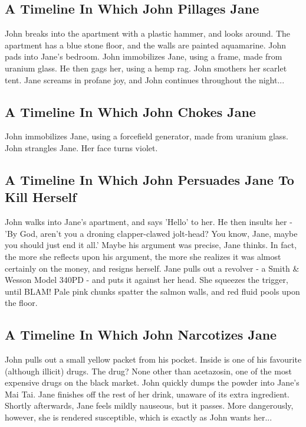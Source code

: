 \documentclass{article}
\begin{document}
\subsection{A Timeline In Which John Pillages Jane}


John breaks into the apartment with a plastic hammer, and looks around.
The apartment has a blue stone floor, and the walls are painted aquamarine.
John pads into Jane's bedroom.
John immobilizes Jane, using a frame, made from uranium glass.
He then gags her, using a hemp rag.
John smothers her scarlet tent.
Jane screams in profane joy, and John continues throughout the night...
\subsection{A Timeline In Which John Chokes Jane}


John immobilizes Jane, using a forcefield generator, made from uranium glass.
John strangles Jane.
Her face turns violet.
\subsection{A Timeline In Which John Persuades Jane To Kill Herself}


John walks into Jane's apartment, and says 'Hello' to her.
He then insults her {-} 'By God, aren't you a droning clapper{-}clawed jolt{-}head?
You know, Jane, maybe you should just end it all.'
Maybe his argument was precise, Jane thinks.
In fact, the more she reflects upon his argument, the more she realizes it was almost certainly on the money, and resigns herself.
Jane pulls out a revolver {-} a Smith \& Wesson Model 340PD {-} and puts it against her head.
She squeezes the trigger, until BLAM!
Pale pink chunks spatter the salmon walls, and red fluid pools upon the floor.
\subsection{A Timeline In Which John Narcotizes Jane}


John pulls out a small yellow packet from his pocket. Inside is one of his favourite (although illicit) drugs.
The drug? None other than acetazosin, one of the most expensive drugs on the black market.
John quickly dumps the powder into Jane's Mai Tai.
Jane finishes off the rest of her drink, unaware of its extra ingredient.
Shortly afterwards, Jane feels mildly nauseous, but it passes.
More dangerously, however, she is rendered susceptible, which is exactly as John wants her...
\end{document}
